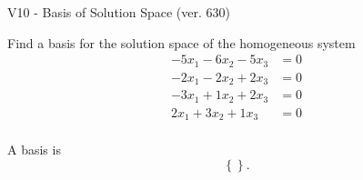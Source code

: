 \begin{exercise}
  \begin{exerciseTitle}V10 - Basis of Solution Space (ver. 630)\end{exerciseTitle}
  \begin{exerciseStatement}
    Find a basis for the solution space of the homogeneous system 
\begin{align*}
 -5 x_ 1 -6 x_ 2 -5 x_ 3 &= 0  \\ 
  -2 x_ 1 -2 x_ 2 + 2 x_ 3 &= 0  \\ 
  -3 x_ 1 + 1 x_ 2 + 2 x_ 3 &= 0  \\ 
  2 x_ 1 + 3 x_ 2 + 1 x_ 3 &= 0  \\ 
 \end{align*}


 
  \end{exerciseStatement}

  \begin{exerciseAnswer}
   A basis is   
\[\left\{\right\}.\]

  


  \end{exerciseAnswer}
\end{exercise}